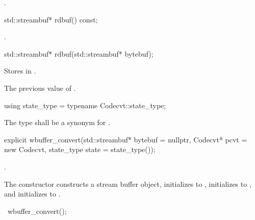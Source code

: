 \begin{itemdescr}
\pnum
\returns {}.
\end{itemdescr}

%
\begin{itemdecl}
std::streambuf* rdbuf() const;
\end{itemdecl}

\begin{itemdescr}
\pnum
\returns {}.
\end{itemdescr}

%
\begin{itemdecl}
std::streambuf* rdbuf(std::streambuf* bytebuf);
\end{itemdecl}

\begin{itemdescr}
\pnum
\effects Stores  in .

\pnum
\returns The previous value of .
\end{itemdescr}

%
\begin{itemdecl}
using state_type = typename Codecvt::state_type;
\end{itemdecl}

\begin{itemdescr}
\pnum
The type shall be a synonym for .
\end{itemdescr}

%
\begin{itemdecl}
explicit wbuffer_convert(std::streambuf* bytebuf = nullptr,
    Codecvt* pcvt = new Codecvt, state_type state = state_type());
\end{itemdecl}

\begin{itemdescr}
\pnum
\requires
{}.

\pnum
\effects The constructor constructs a stream buffer object, initializes
 to , initializes 
to , and initializes  to .
\end{itemdescr}

%
\begin{itemdecl}
~wbuffer_convert();
\end{itemdecl}

